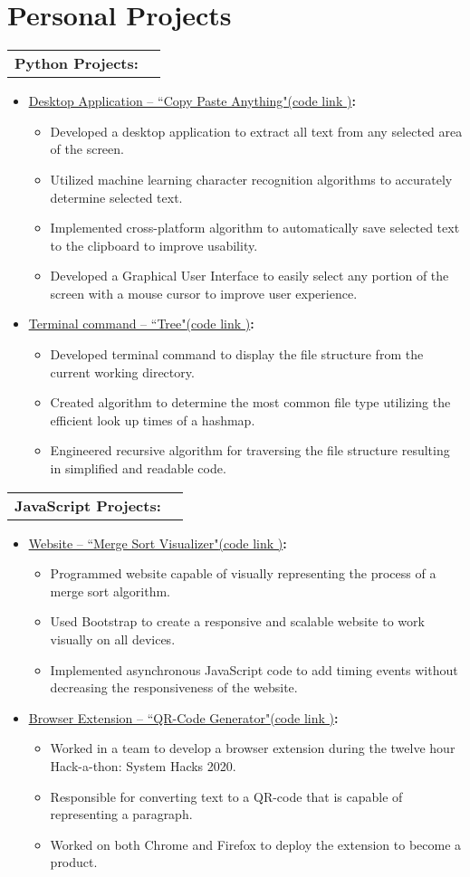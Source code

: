 \documentclass[letterpaper, 11pt]{article}
\makeatletter
\newcommand{\project}[2]{
  \item\small{
    \href{#2}{\underline{#1}\hspace{3pt}(code link \faExternalLink)}\textbf{:} \vspace{-5pt}
  }
  \begin{itemize}
}
\newcommand{\resumeSubheading}[1]{
  \vspace{-1pt}
    \begin{tabular*}{0.97\textwidth}[t]{l@{\extracolsep{\fill}}r}
      \textbf{#1} \\
    \end{tabular*}\vspace{-5pt}
}
\newcommand{\projectEnd}{\end{itemize}}
\newcommand{\resumeItemListStart}{\begin{itemize}}
\newcommand{\resumeItemListEnd}{\end{itemize}}
\makeatother
\begin{document}
\section{Personal Projects}
    \resumeSubheading
      {Python Projects:}
      \resumeItemListStart
        \project{Desktop Application -- “Copy Paste Anything"} {https://github.com/Alex0Blackwell/copy-paste-anything}
          \item{Developed a desktop application to extract all text from any selected area of the screen.}
          \item{Utilized machine learning character recognition algorithms to accurately determine selected
          text.}
          \item{Implemented cross-platform algorithm to automatically save selected text to the clipboard to improve usability.}
          \item{Developed a Graphical User Interface to easily select any portion of the screen with a mouse cursor to improve user experience.}
        \projectEnd
        \project{Terminal command -- “Tree"} {https://github.com/Alex0Blackwell/tree}
          \item{Developed terminal command to display the file structure from the current working directory.}
          \item{Created algorithm to determine the most common file type utilizing the efficient look up times of a hashmap.}
          \item{Engineered recursive algorithm for traversing the file structure resulting in simplified and readable code.}
        \projectEnd
      \resumeItemListEnd
      \vspace{10pt}

    \resumeSubheading
      {JavaScript Projects:}
      \resumeItemListStart
        \project{Website -- “Merge Sort Visualizer"} {https://github.com/Alex0Blackwell/merge-sort-visualizer}
          \item{Programmed website capable of visually representing the process of a merge sort algorithm.}
          \item{Used Bootstrap to create a responsive and scalable website to work visually on all devices.}
          \item{Implemented asynchronous JavaScript code to add timing events without decreasing the responsiveness of the website.}
        \projectEnd
        \project{Browser Extension -- “QR-Code Generator"} {https://github.com/Alex0Blackwell/qr-code-extension}
          \item{Worked in a team to develop a browser extension during the twelve hour Hack-a-thon: System Hacks 2020.}
          \item{Responsible for converting text to a QR-code that is capable of representing a paragraph.}
          \item{Worked on both Chrome and Firefox to deploy the extension to become a product.}
        \projectEnd
      \resumeItemListEnd
      \vspace{10pt}
\end{document}

